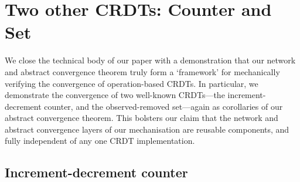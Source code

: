 \section{Two other CRDTs: Counter and Set}
\label{sect.simple.crdts}

We close the technical body of our paper with a demonstration that our network and abstract convergence theorem truly form a `framework' for mechanically verifying the convergence of operation-based CRDTs.
In particular, we demonstrate the convergence of two well-known CRDTs---the increment-decrement counter, and the observed-removed set---again as corollaries of our abstract convergence theorem.
This bolsters our claim that the network and abstract convergence layers of our mechanisation are reusable components, and fully independent of any one CRDT implementation.

\subsection{Increment-decrement counter}
\label{subsect.increment-decrement.counter}

